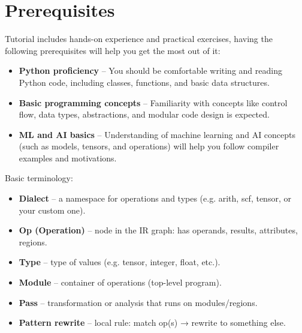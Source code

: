 \documentclass[../main.tex]{subfiles}
\begin{document}
\section{Prerequisites}

Tutorial includes hands-on experience and practical exercises, having the following prerequisites
will help you get the most out of it:
\begin{itemize}
  \item \textbf{Python proficiency} – You should be comfortable writing and reading Python code, including classes, functions, and basic data structures.
  \item \textbf{Basic programming concepts} – Familiarity with concepts like control flow, data types, abstractions, and modular code design is expected.
  \item \textbf{ML and AI basics} – Understanding of machine learning and AI concepts (such as models, tensors, and operations) will help you follow compiler examples and motivations.
\end{itemize}

Basic terminology:
\begin{itemize}
    \item \textbf{Dialect} – a namespace for operations and types (e.g. arith, scf, tensor, or your custom one).
    \item \textbf{Op (Operation)} – node in the IR graph: has operands, results, attributes, regions.
    \item \textbf{Type} – type of values (e.g. tensor, integer, float, etc.).
    \item \textbf{Module} – container of operations (top-level program).
    \item \textbf{Pass} – transformation or analysis that runs on modules/regions.
    \item \textbf{Pattern rewrite} – local rule: match op(s) → rewrite to something else.
\end{itemize}
\end{document}
